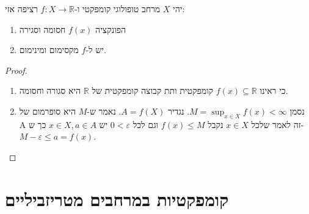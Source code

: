 \documentclass{tstextbook}
\begin{document}
\begin{proposition}
יהי \(X\) מרחב טופולוגי קומפקטי ו-\(f:X\to \mathbb{R}\) רציפה אזי:

  \begin{enumerate}
    \item הפונקציה \(f(x)\) חסומה וסגירה 


    \item יש ל-\(f\) מקסימום ומינימום. 


  \end{enumerate}
\end{proposition}
\begin{proof}
  \begin{enumerate}
    \item כי ראינו \(f(x)\subseteq \mathbb{R}\) קומפקטית ותת קבוצה קומפקטית של \(\mathbb{R}\) היא סגורה וחסומה. 


    \item נסמן \(M=\sup_{x \in X} f(x)<\infty\). נגדיר \(A=f(X)\). נאמר ש-\(M\) היא סופרמום של A זה לאמר שלכל \(x \in X\) נקבל \(f(x)\leq M\) וגם לכל \(0<\varepsilon\) יש \(x \in X,a \in A\) כך ש-\(M-\varepsilon \leq a=f(x)\). 


  \end{enumerate}
\end{proof}
\section{קומפקטיות במרחבים מטריזביליים}
\end{document}
